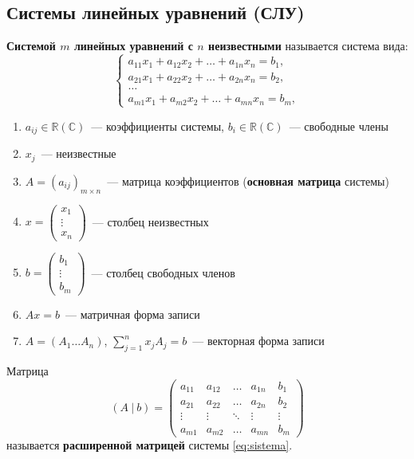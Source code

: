 \documentclass[10pt]{article}
\begin{document}
\subsection*{Системы линейных уравнений (СЛУ)}

\begin{definition}
\textbf{Системой $m$ линейных уравнений с $n$ неизвестными} называется система вида:
\begin{equation} \label{eq:sistema}
\begin{cases}
a_{11}x_1 + a_{12}x_2 + \dots + a_{1n}x_n = b_1, \\
a_{21}x_1 + a_{22}x_2 + \dots + a_{2n}x_n = b_2, \\
\dots \\
a_{m1}x_1 + a_{m2}x_2 + \dots + a_{mn}x_n = b_m,
\end{cases}
\end{equation}

\begin{enumerate}
    \item $a_{ij} \in \mathbb{R} (\mathbb{C})$~--- коэффициенты системы, $b_i \in \mathbb{R} (\mathbb{C})$~--- свободные члены
    \item $x_j$~--- неизвестные
    \item $A = (a_{ij})_{m \times n}$~--- матрица коэффициентов (\textbf{основная матрица} системы)
    \item $x = \begin{pmatrix}
        x_1 \\ \vdots \\ x_n
    \end{pmatrix}$~--- столбец неизвестных
    \item $b = \begin{pmatrix}
        b_1 \\ \vdots \\ b_m
    \end{pmatrix}$~--- столбец свободных членов
    \item $Ax = b$~--- матричная форма записи
    \item $A = (A_1 \dots A_n)$, $\sum_{j=1}^n x_jA_j=b$~--- векторная форма записи
\end{enumerate}
\end{definition}

\begin{definition}
Матрица
\[ (A \: | \: b) = \begin{pmatrix}
a_{11} & a_{12} & \dots & a_{1n} & b_1 \\
a_{21} & a_{22} & \dots & a_{2n} & b_2 \\
\vdots & \vdots & \ddots & \vdots & \vdots \\
a_{m1} & a_{m2} & \dots & a_{mn} & b_m
\end{pmatrix}
\]
называется \textbf{расширенной матрицей} системы \eqref{eq:sistema}.
\end{definition}
\end{document}
